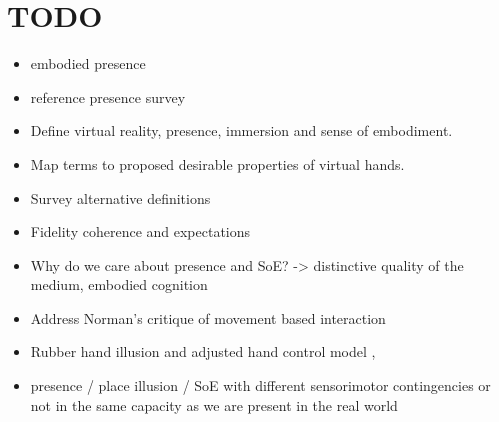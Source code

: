 \section{TODO}

\begin{itemize}
\item embodied presence \parencite{Schubert1999}
\item reference presence survey \parencite{Schuemie2001}
\item Define virtual reality, presence, immersion and sense of embodiment.
\item Map terms to proposed desirable properties of virtual hands.
\item Survey alternative definitions
\item Fidelity coherence and expectations \parencite{Nowak2003, Argelaguet2016}
\item Why do we care about presence and SoE? -> distinctive quality of the medium, embodied cognition
\item Address Norman's critique of movement based interaction \parencite{Gillies2016}
\item Rubber hand illusion and adjusted hand control model \parencite{Sanchez-Vives2010}, \parencite{Fourneret1998}
\item presence / place illusion / SoE with different sensorimotor contingencies or not in the same capacity as we are present in the real world
\end{itemize}